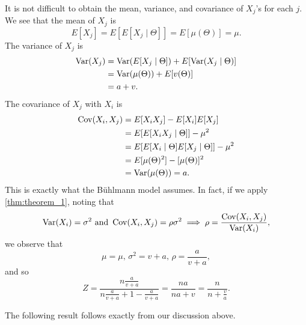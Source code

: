 \documentclass[notoc,notitlepage]{tufte-book}
\begin{document}
It is not difficult to obtain the mean, variance, and covariance of $X_j$'s for
each $j$. We see that the mean of $X_j$ is
\begin{equation*}
  E[X_j] = E[E[X_j \mid \Theta]] = E[\mu(\Theta)] = \mu.
\end{equation*}
The variance of $X_j$ is
\begin{align*}
  \operatorname{Var}(X_j) &= \operatorname{Var}(E[X_j \mid \Theta]) + E[\operatorname{Var}(X_j \mid \Theta)] \\
            &= \operatorname{Var}(\mu(\Theta)) + E[v(\Theta)] \\
            &= a + v.
\end{align*}
The covariance of $X_j$ with $X_i$ is
\begin{align*}
  \operatorname{Cov}(X_i, X_j) &= E[X_i X_j] - E[X_i] E[X_j] \\
                 &= E[E[X_i X_j \mid \Theta]] - \mu^2 \\
                 &= E[E[X_i \mid \Theta] E[X_j \mid \Theta]] - \mu^2 \\
                 &= E[\mu(\Theta)^2] - [\mu(\Theta)]^2 \\
                 &= \operatorname{Var}(\mu(\Theta)) = a.
\end{align*}
This is exactly what the B\"{u}hlmann model assumes. In fact, if we apply
\cref{thm:theorem_1}, noting that
\begin{equation*}
  \operatorname{Var}(X_i) = \sigma^2 \text{ and } \operatorname{Cov}(X_i, X_j) = \rho \sigma^2
  \implies \rho = \frac{\operatorname{Cov}(X_i, X_j)}{\operatorname{Var}(X_i)},
\end{equation*}
we observe that
\begin{equation*}
  \mu = \mu,\, \sigma^2 = v + a,\, \rho = \frac{a}{v + a},
\end{equation*}
and so
\begin{equation*}
  Z = \frac{n \frac{a}{v + a}}{n \frac{a}{v + a} + 1 - \frac{a}{v+a}}
  = \frac{na}{na + v} = \frac{n}{n + \frac{v}{a}}.
\end{equation*}

The following result follows exactly from our discussion above.
\end{document}
